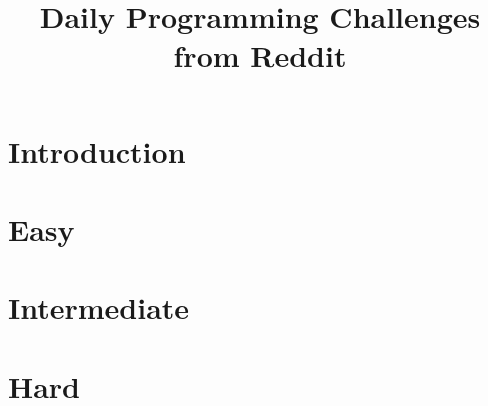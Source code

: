 \documentclass{book}
\title{Daily Programming Challenges from Reddit}
\begin{document}
    
\maketitle

\tableofcontents

\chapter{Introduction}


\chapter{Easy}




\chapter{Intermediate}




\chapter{Hard}




\printindex
\end{document}
